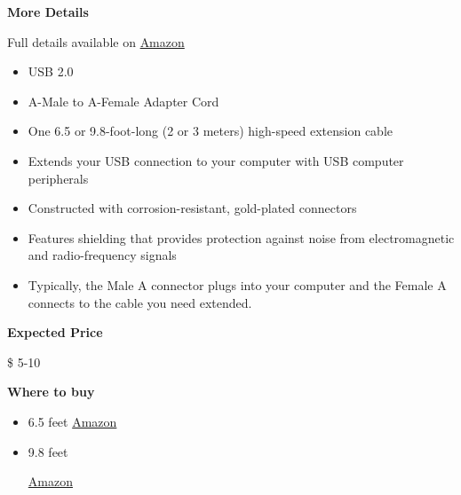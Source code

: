 \begin{gram}
\label{grm:equipment::accessories::usbextend}
\textbf{More Details}

Full details available on \href{https://www.amazon.com/AmazonBasics-Extension-Cable-Male-Female/dp/B00NH11PEY/ref=sr_1_3?crid=37GCZPQHYO54W&keywords=usb+extension+cable&qid=1582900847&s=electronics&sprefix=usb+ext,electronics,164&sr=1-3}{Amazon}

\begin{itemize}
\item USB 2.0
\item A-Male to A-Female Adapter Cord
\item  One 6.5 or 9.8-foot-long (2 or 3 meters) high-speed extension cable
\item Extends your USB connection to your computer with USB computer peripherals
\item 
Constructed with corrosion-resistant, gold-plated connectors
\item Features shielding that provides protection against noise from electromagnetic and radio-frequency signals
\item Typically, the Male A connector plugs into your computer and the Female A connects to the cable you need extended. 

\end{itemize}

\textbf{Expected Price}

\$ 5-10

\textbf{Where to buy}

\begin{itemize}
\item 
6.5 feet
\href{https://www.amazon.com/AmazonBasics-Extension-Cable-Male-Female/dp/B00NH136G}{Amazon}

\item
9.8 feet

\href{https://www.amazon.com/AmazonBasics-Extension-Cable-Male-Female/dp/B00NH11PEY/ref=sr_1_3?crid=37GCZPQHYO54W&keywords=usb+extension+cable&qid=1582900847&s=electronics&sprefix=usb+ext,electronics,164&sr=1-3}{Amazon}
\end{itemize}
\end{gram}


